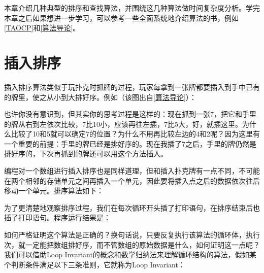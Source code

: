 本章介绍几种典型的排序和查找算法，并围绕这几种算法做时间复杂度分析。学完本章之后如果想进一步学习，可以参考一些全面系统地介绍算法的书，例如\hyperlink{db.bi01.bibli.taocp}{[TAOCP]}和\hyperlink{db.bi01.bibli.algorithm}{[算法导论]}。




\section{插入排序}
%
插入排序算法类似于玩扑克时抓牌的过程，玩家每拿到一张牌都要插入到手中已有的牌里，使之从小到大排好序。例如（该图出自\hyperlink{db.bi01.bibli.algorithm}{[算法导论]}）：




也许你没有意识到，但其实你的思考过程是这样的：现在抓到一张7，把它和手里的牌从右到左依次比较，7比10小，应该再往左插，7比5大，好，就插这里。为什么比较了10和5就可以确定7的位置？为什么不用再比较左边的4和2呢？因为这里有一个重要的前提：手里的牌已经是排好序的。现在我插了7之后，手里的牌仍然是排好序的，下次再抓到的牌还可以用这个方法插入。



编程对一个数组进行插入排序也是同样道理，但和插入扑克牌有一点不同，不可能在两个相邻的存储单元之间再插入一个单元，因此要将插入点之后的数据依次往后移动一个单元。排序算法如下：





为了更清楚地观察排序过程，我们在每次循环开头插了打印语句，在排序结束后也插了打印语句。程序运行结果是：




如何严格证明这个算法是正确的？换句话说，只要反复执行该算法的循环体，执行次，就一定能把数组排好序，而不管数组的原始数据是什么，如何证明这一点呢？我们可以借助Loop Invariant的概念和数学归纳法来理解循环结构的算法，假如某个判断条件满足以下三条准则，它就称为Loop Invariant：


